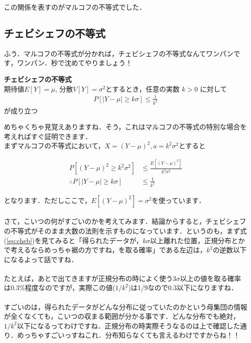 \documentclass[11pt,a4paper]{ujreport} 	%
\begin{document}
この関係を表すのがマルコフの不等式でした．

\subsection{チェビシェフの不等式}
ふう．マルコフの不等式が分かれば，チェビシェフの不等式なんてワンパンです，ワンパン．秒で沈めてやりましょう！

\begin{screen}
  \textbf{チェビシェフの不等式}\\
  期待値$E[Y] = \mu$, 分散$V[Y] = \sigma^2$とするとき，任意の実数 $k>0$ に対して
  \begin{align}
    P[|Y-\mu| \geq k\sigma] \leq \frac{1}{k^2}
    \label{eq:cheb}
  \end{align}
  が成り立つ
\end{screen}

めちゃくちゃ見覚えありますね．そう，これはマルコフの不等式の特別な場合を考えればすぐ証明できます．\\

まずマルコフの不等式において，$X=(Y-\mu)^2, a = k^2\sigma^2$とすると

\begin{align}
  P[(Y-\mu)^2 \geq k^2\sigma^2] &\leq \frac{E[(Y-\mu)^2]}{k^2\sigma^2}\\
  \therefore P[|Y-\mu| \geq k\sigma] &\leq \frac{1}{k^2}
\end{align}

となります．ただしここで，$E[(Y-\mu)^2]=\sigma^2$を使っています．\\\\

さて，こいつの何がすごいのかを考えてみます．結論からすると，チェビシェフの不等式がそのまま大数の法則を示すものになっています．というのも，まず式(\ref{eq:cheb})を見てみると「得られたデータが，$k\sigma$以上離れた位置，正規分布とかで考えるならめっちゃ裾の方ですね，を取る確率」である左辺は，$k^2$の逆数以下になるよって話ですね．\\
\\

たとえば，あとで出てきますが正規分布の時によく使う$3\sigma$以上の値を取る確率は0.3\%程度なのですが，実際この値($1/k^2$)は1/9なので0.3以下になりますね．\\
\\

すごいのは，得られたデータがどんな分布に従っていたのかという母集団の情報が全くなくても，こいつの収まる範囲が分かる事です．どんな分布でも絶対，$1/k^2$以下になるってわけですね．正規分布の時実際そうなるのは上で確認した通り．めっちゃすごいっすねこれ．分布知らなくても言えるわけですからね！！
\end{document}
